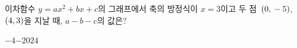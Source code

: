 이차함수 $y=ax^2+bx+c$의 그래프에서 축의 방정식이 $x=3$이고 두 점~$(0{,}\mkern3mu -5)$, $(4{,}\mkern3mu 3)$을 지날 때, $a-b-c$의 값은? 
\begin{choices32}{$-4$}{$-2$}{$0$}{$2$}{$4$}\end{choices32}
